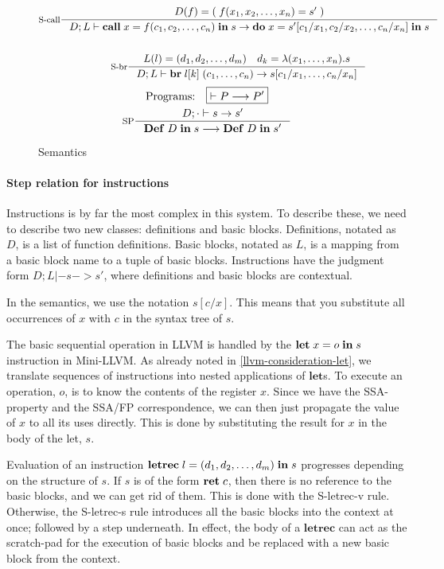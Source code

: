 \documentclass[a4paper, oneside, 10pt, draft]{memoir}
\begin{document}
\begin{figure}
\begin{gather*}
    \inference[S-call]{D(f) = (\;f(x_1, x_2, \dotsc, x_n) = s'\;)}{D;L |-
      \icall{x}{f}{(c_1, c_2, \dotsc, c_n)}{s} -> \ido{x}{s'[c_1/x_1, c_2/x_2,
        \dotsc, c_n/x_n]}{s}}\\\\
    \inference[S-br]{L(l) = \dbundle \quad d_k = \lambda(x_1, \dotsc,
      x_n).s}{D;L |- \ibr{\lbl{k}}{(c_1, \dotsc, c_n)} -> s[c_1/x_1, \dotsc, c_n/x_n]}
 \end{gather*}
 \begin{gather*}
   \text{Programs:} \quad \boxed{|- P --> P'}\\
   \inference[SP]{D;\cdot |- s -> s'}{\ipgm{D}{s} --> \ipgm{D}{s'}}
 \end{gather*}
  \caption{Semantics}
  \label{fig:semantics}
\end{figure}

\paragraph{Step relation for instructions}

Instructions is by far the most complex in this system. To describe
these, we need to describe two new classes: definitions and basic
blocks. Definitions, notated as $D$, is a list of function
definitions. Basic blocks, notated as $L$, is a mapping from a basic
block name to a tuple of basic blocks. Instructions have the
judgment form $\boxed{D;L |- s -> s'}$, where definitions and basic
blocks are contextual.

In the semantics, we use the notation $s[c/x]$. This means that you
substitute all occurrences of $x$ with $c$ in the syntax tree of
$s$.

The basic sequential operation in LLVM is handled by the
$\mathbf{let} \; x = o \; \mathbf{in} \; s$ instruction in Mini-LLVM. As already noted in
\ref{llvm-consideration-let}, we translate sequences of instructions
into nested applications of $\mathbf{let}$s. To execute an operation,
$o$, is to know the contents of the register $x$. Since we have the
SSA-property and the SSA/FP correspondence, we can then just propagate
the value of $x$ to all its uses directly. This is done by
substituting the result for $x$ in the body of the let, $s$.

Evaluation of an instruction $\mathbf{letrec} \; l = (d_1, d_2, \dotsc, d_m) \; \mathbf{in} \; s$ progresses
depending on the structure of $s$. If $s$ is of the form $\mathbf{ret} \; c$,
then there is no reference to the basic blocks, and we can get rid of
them. This is done with the S-letrec-v rule. Otherwise, the S-letrec-s
rule introduces all the basic blocks into the context at once;
followed by a step underneath.  In effect, the body of a
$\mathbf{letrec}$ can act as the scratch-pad for the execution of
basic blocks and be replaced with a new basic block from the context.
\end{document}
